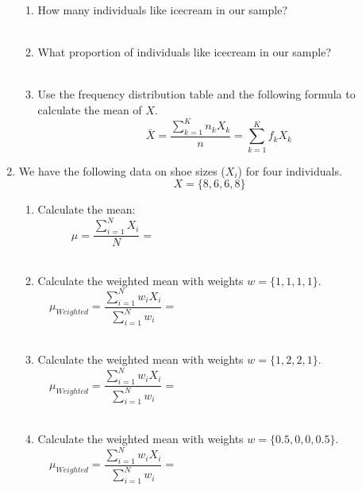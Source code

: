 \documentclass{./../../Latex/handout}
\begin{document}
\begin{enumerate}
\begin{enumerate}
\item How many individuals like icecream in our sample? \\~\\
\item What proportion of individuals like icecream in our sample? \\~\\
\item Use the frequency distribution table and the following formula to calculate the mean of $X$. 
$$ \bar{X} = \frac{\sum_{k=1}^K n_k X_k}{n} = \sum_{k=1}^K f_k X_k $$
\end{enumerate}

\newpage
\item We have the following data on shoe sizes ($X_i$) for four individuals. 
$$ X = \{8, 6, 6, 8 \}$$
\begin{enumerate}
\item Calculate the mean:
$$ \mu = \frac {\sum_{i=1}^N X_i}{N} = \hspace{8cm} $$ \\
\item Calculate the weighted mean with weights $ w=  \{1, 1, 1, 1 \}$.
$$ \mu_{Weighted} = \frac {\sum_{i=1}^N w_i X_i}{\sum_{i=1}^N w_i } = \hspace{8cm} $$ \\
\item Calculate the weighted mean with weights $ w=  \{1, 2, 2, 1 \}$.
$$ \mu_{Weighted} = \frac {\sum_{i=1}^N w_i X_i}{\sum_{i=1}^N w_i } = \hspace{8cm} $$ \\
\item Calculate the weighted mean with weights $ w=  \{0.5, 0, 0, 0.5 \}$.
$$ \mu_{Weighted} = \frac {\sum_{i=1}^N w_i X_i}{\sum_{i=1}^N w_i } = \hspace{8cm} $$ 
\end{enumerate}
\vspace{4em}
\end{enumerate}
\end{document}
